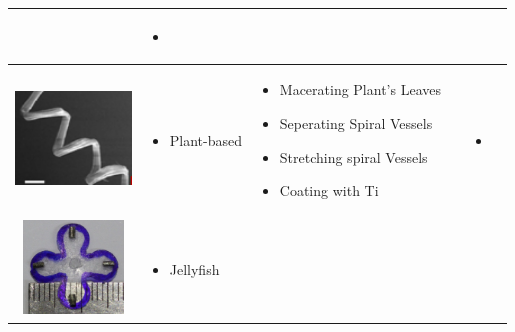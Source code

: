 \documentclass[12pt,a4paper,titlepage]{report}
\begin{document}
\begin{table}[h!]
\begin{tabular}{ c m{2.5cm}  m{4.3cm} m{3cm} m{2cm}}
	&
	   \begin{itemize}
        \item \citep{C2NR32798H}
   
      \end{itemize}
    \\ \hline


 \begin{minipage}{.3\textwidth}
      \includegraphics[width=\linewidth, height=25mm]{plant_ta}
    \end{minipage}
    &
    \begin{minipage}[t]{3cm}
      \begin{itemize}
        \item Plant-based
      
      \end{itemize}
    \end{minipage}
    & 
    \begin{minipage}[t]{4cm}
      \begin{itemize}
        \item Macerating Plant\rq{}s Leaves
	\item Seperating Spiral Vessels
	\item Stretching spiral Vessels
	\item Coating with Ti

      \end{itemize}
    \end{minipage}
	&



	&
	   \begin{itemize}
        \item \citep{gao2013bioinspired}
   
      \end{itemize}
    \\ \hline


 \begin{minipage}{.3\textwidth}
      \includegraphics[width=\linewidth, height=25mm]{Jelly}
    \end{minipage}
    &
    \begin{minipage}[t]{3cm}
      \begin{itemize}
        \item Jellyfish
     

\end{itemize}
\end{minipage}
\end{tabular}
\end{table}
\end{document}
